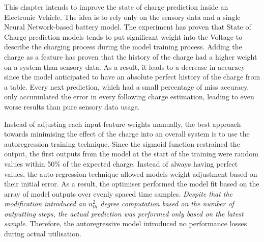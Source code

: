 This chapter intends to improve the state of charge prediction inside an Electronic Vehicle.
The idea is to rely only on the sensory data and a single Neural Network-based battery model.
The experiment has proven that State of Charge prediction models tends to put significant weight into the Voltage to describe the charging process during the model training process.
Adding the charge as a feature has proven that the history of the charge had a higher weight on a system than sensory data.
As a result, it leads to a decrease in accuracy since the model anticipated to have an absolute perfect history of the charge from a table.
Every next prediction, which had a small percentage of miss accuracy, only accumulated the error in every following charge estimation, leading to even worse results than pure sensory data usage.

%
%
Instead of adjusting each input feature weights manually, the best approach towards minimising the effect of the charge into an overall system is to use the autoregression training technique.
Since the sigmoid function restrained the output, the first outputs from the model at the start of the training were random values within 50\% of the expected charge.
Instead of always having perfect values, the auto-regression technique allowed models weight adjustment based on their initial error.
As a result, the optimiser performed the model fit based on the array of model outputs over evenly spaced time samples.
\textit{Despite that the modification introduced an $n_{th}^{2}$ degree computation based on the number of outputting steps, the actual prediction was performed only based on the latest sample.}
Therefore, the autoregressive model introduced no performance losses during actual utilisation. 

    



